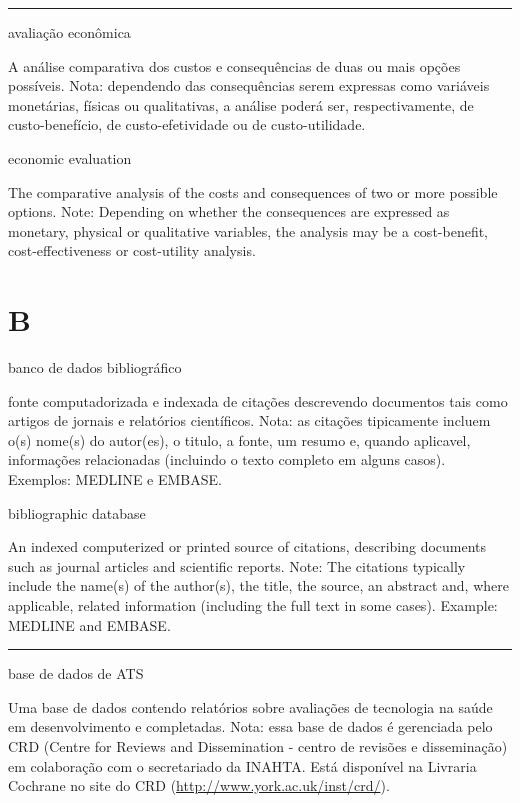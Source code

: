 \documentclass[
]{book}
\begin{document}
\begin{center}\rule{0.5\linewidth}{0.5pt}\end{center}

avaliação econômica

A análise comparativa dos custos e consequências de duas ou mais opções possíveis. Nota: dependendo das consequências serem expressas como variáveis monetárias, físicas ou qualitativas, a análise poderá ser, respectivamente, de custo-benefício, de custo-efetividade ou de custo-utilidade.

economic evaluation

The comparative analysis of the costs and consequences of two or more possible options. Note: Depending on whether the consequences are expressed as monetary, physical or qualitative variables, the analysis may be a cost-benefit, cost-effectiveness or cost-utility analysis.

\hypertarget{b}{%
\chapter*{B}\label{b}}

banco de dados bibliográfico

fonte computadorizada e indexada de citações descrevendo documentos tais como artigos de jornais e relatórios científicos. Nota: as citações tipicamente incluem o(s) nome(s) do autor(es), o titulo, a fonte, um resumo e, quando aplicavel, informações relacionadas (incluindo o texto completo em alguns casos). Exemplos: MEDLINE e EMBASE.

bibliographic database

An indexed computerized or printed source of citations, describing documents such as journal articles and scientific reports. Note: The citations typically include the name(s) of the author(s), the title, the source, an abstract and, where applicable, related information (including the full text in some cases). Example: MEDLINE and EMBASE.

\begin{center}\rule{0.5\linewidth}{0.5pt}\end{center}

base de dados de ATS

Uma base de dados contendo relatórios sobre avaliações de tecnologia na saúde em desenvolvimento e completadas. Nota: essa base de dados é gerenciada pelo CRD (Centre for Reviews and Dissemination - centro de revisões e disseminação) em colaboração com o secretariado da INAHTA. Está disponível na Livraria Cochrane no site do CRD (\url{http://www.york.ac.uk/inst/crd/}).
\end{document}
